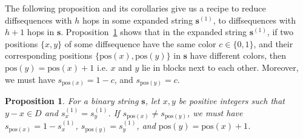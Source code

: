 \documentclass[10pt,a4paper]{amsart}
\newtheorem{rem}{Remark}
\newtheorem{proposition}{Proposition}
\begin{document}





The following proposition and its corollaries give us a recipe to reduce diffsequences with $h$ hops in some expanded string $\mathbf{s}^{(1)}$, to diffsequences with $h+1$ hops in $\mathbf{s}$. Proposition~\ref{prop: reduce_diffseq} shows that in the expanded string $\mathbf{s}^{(1)}$, if two positions $\{x,y\}$ of some diffsequence have the same color $c \in \{0, 1 \}$, and their corresponding positions $\{\text{pos}(x), \text{pos}(y) \}$ in $\mathbf{s}$ have different colors, then $\text{pos}(y)=\text{pos}(x)+1$ i.e. $x$ and $y$ lie in blocks next to each other. Moreover, we must have $s_{\text{pos}(x)}=1-c$, and $ s_{\text{pos}(y)}=c$. 

\begin{proposition}\label{prop: reduce_diffseq}
    For a binary string $\mathbf{s}$,
    let $x,y$ be positive integers such that $y-x\in D$ and $s^{(1)}_x=s^{(1)}_y$. If $s_{\text{pos}(x)}\neq s_{\text{pos}(y)}$, we must have $s_{\text{pos}(x)}=1-s^{(1)}_x$, $ s_{\text{pos}(y)}=s^{(1)}_y$, and $\text{pos}(y)=\text{pos}(x)+1$.
\end{proposition}
\end{document}
